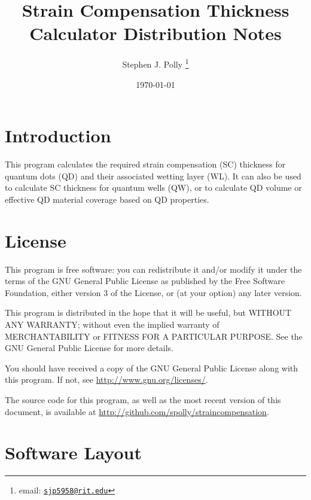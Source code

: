 \documentclass{article}
\begin{document}
\title{Strain Compensation Thickness Calculator Distribution Notes}

\author{Stephen J. Polly
	\thanks{email: \texttt{\href{mailto:sjp5958@rit.edu}{sjp5958@rit.edu}}}}



\date{\today}

\maketitle

\section{Introduction}
This program calculates the required strain compensation (SC) thickness for quantum dots (QD) and their associated wetting layer (WL). It can also be used to calculate SC thickness for quantum wells (QW), or to calculate QD volume or effective QD material coverage based on QD properties.

\section{License}

This program is free software: you can redistribute it and/or modify it under the terms of the GNU General Public License as published by the Free Software Foundation, either version 3 of the License, or (at your option) any later version.

This program is distributed in the hope that it will be useful, but WITHOUT ANY WARRANTY; without even the implied warranty of MERCHANTABILITY or FITNESS FOR A PARTICULAR PURPOSE.  See the GNU General Public License for more details.

You should have received a copy of the GNU General Public License along with this program.  If not, see \url{http://www.gnu.org/licenses/}.

The source code for this program, as well as the most recent version of this document, is available at \url{http://github.com/spolly/straincompensation}.

\section{Software Layout}
\end{document}
